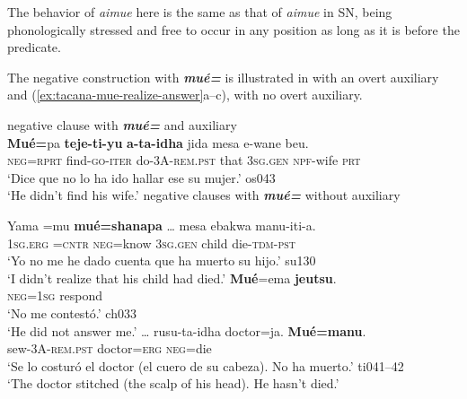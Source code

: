 \documentclass[output=paper,draft,draftmode,colorlinks,citecolor=brown]{langscibook}
\begin{document}
\largerpage
The behavior of \textit{aimue} here is the same as that of \textit{aimue} in SN, being phonologically stressed and free to occur in any position as long as it is before the predicate.

The negative construction with \textbf{\textit{mué=}} is illustrated in
 with an overt auxiliary and
(\ref{ex:tacana-mue-realize-answer}a--c), with no overt auxiliary.

\begin{exe}\ex \label{ex:tacana-mueaux}  negative clause with
\textbf{\textit{mué=}} and auxiliary\\
\gll  \textbf{Mué=}pa \textbf{teje-ti-yu} \textbf{a-ta-idha}
\makebox[0pt][l]{\raisebox{\baselineskip}{O}}{\ob}jida mesa e-wane{\cb} beu.\\
 \textsc{neg=rprt}  find-\textsc{go-iter}  do\textsc{-3A-rem.pst}  that
 \textsc{3sg.gen}  \textsc{npf}-wife  \textsc{prt}\\
\glt `Dice que no lo ha ido hallar ese su mujer.' os043\\
`He didn't find his wife.'
\ex \label{ex:tacana-mue-realize-answer} negative clauses with
\textbf{\textit{mué=}} without auxiliary
\begin{xlist}
\ex\label{}
\gll  {}Yama  =mu
\textbf{mué=shanapa}
\ob\ldots{\cb} {\ob}mesa ebakwa{\cb} manu-iti-a.\\
\textsc{1sg.erg}  \textsc{=cntr}  \textsc{neg}=know {} 3\textsc{sg.gen}
child die-\textsc{tdm-pst}\\
\glt `Yo no me he dado cuenta que ha muerto su hijo.' su130\\
`I didn't realize that his child had died.'
\ex\label{ex:tacana-mue-answer}
\gll {}\textbf{Mué}=ema
\textbf{jeutsu}.\\
    \textsc{neg=1sg} respond\\
\glt `No me contestó.' ch033\\
`He did not answer me.'
\ex\label{ex:tacana-mue-doctor}
\gll  \ldots{} rusu-ta-idha doctor=ja.
\textbf{Mué=manu}.\\
{}    sew-3A\textsc{-rem.pst}  doctor=\textsc{erg}  \textsc{neg}=die\\
\glt `Se lo costuró el doctor (el cuero de su cabeza). No ha muerto.'
ti041--42\\
`The doctor stitched (the scalp of his head). He hasn't died.'
\end{xlist}\end{exe}
\end{document}
